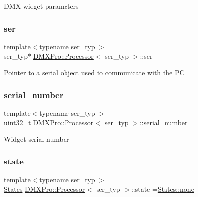 D\+MX widget parameters \mbox{\label{classDMXPro_1_1Processor_afad2bc7129dfc3e1f039af5ae0243802}} 
\subsubsection{\texorpdfstring{ser}{ser}}
{\footnotesize\ttfamily template$<$typename ser\+\_\+typ $>$ \\
ser\+\_\+typ$\ast$ \hyperlink{classDMXPro_1_1Processor}{D\+M\+X\+Pro\+::\+Processor}$<$ ser\+\_\+typ $>$\+::ser\hspace{0.3cm}{\ttfamily [private]}}

Pointer to a serial object used to communicate with the PC \mbox{\label{classDMXPro_1_1Processor_ab3573fe1aa615ec51dfd826c7f2747f9}} 
\subsubsection{\texorpdfstring{serial\+\_\+number}{serial\_number}}
{\footnotesize\ttfamily template$<$typename ser\+\_\+typ $>$ \\
uint32\+\_\+t \hyperlink{classDMXPro_1_1Processor}{D\+M\+X\+Pro\+::\+Processor}$<$ ser\+\_\+typ $>$\+::serial\+\_\+number\hspace{0.3cm}{\ttfamily [private]}}

Widget serial number \mbox{\label{classDMXPro_1_1Processor_a1b0ea97d2f76042a9c5c65d6fbb88df0}} 
\subsubsection{\texorpdfstring{state}{state}}
{\footnotesize\ttfamily template$<$typename ser\+\_\+typ $>$ \\
\hyperlink{classDMXPro_1_1Processor_ab5c1e3e1ccd6dd60b9e05c3438341a24}{States} \hyperlink{classDMXPro_1_1Processor}{D\+M\+X\+Pro\+::\+Processor}$<$ ser\+\_\+typ $>$\+::state =\hyperlink{classDMXPro_1_1Processor_ab5c1e3e1ccd6dd60b9e05c3438341a24a334c4a4c42fdb79d7ebc3e73b517e6f8}{States\+::none}\hspace{0.3cm}{\ttfamily [private]}}

